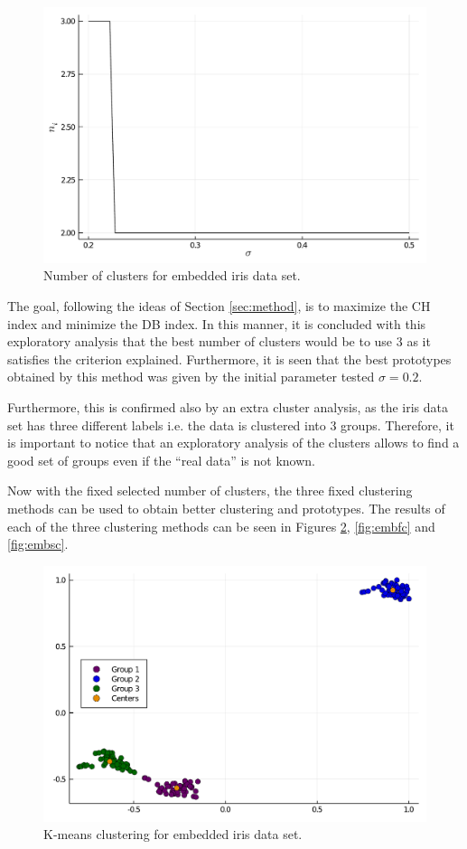 \documentclass[conference]{IEEEtran}
\theoremstyle{definition}
\theoremstyle{remark}
\theoremstyle{remark}
\begin{document}
\begin{figure}[t]
  \centering
  \includegraphics[scale=.35]{figs/iris/exploring-2d-emb-n}
  \caption{Number of clusters for embedded iris data set.}
  \label{fig:expembn}
\end{figure}

The goal, following the ideas of Section \ref{sec:method}, is to maximize the CH
index and minimize the DB index. In this manner, it is concluded with this
exploratory analysis that the best number of clusters would be to use 3 as it
satisfies the criterion explained. Furthermore, it is seen that the best
prototypes obtained by this method was given by the initial parameter tested
$\sigma=0.2$.

Furthermore, this is confirmed also by an extra cluster analysis, as the iris
data set has three different labels i.e. the data is clustered into 3 groups.
Therefore, it is important to notice that an exploratory analysis of the
clusters allows to find a good set of groups even if the ``real data'' is not
known.

Now with the fixed selected number of clusters, the three fixed clustering
methods can be used to obtain better clustering and prototypes. The results of
each of the three clustering methods can be seen in Figures \ref{fig:embk},
\ref{fig:embfc} and \ref{fig:embsc}.

\begin{figure}[t]
  \centering
  \includegraphics[scale=.35]{figs/iris/emb-k-means}
  \caption{K-means clustering for embedded iris data set.}
  \label{fig:embk}
\end{figure}
\end{document}
